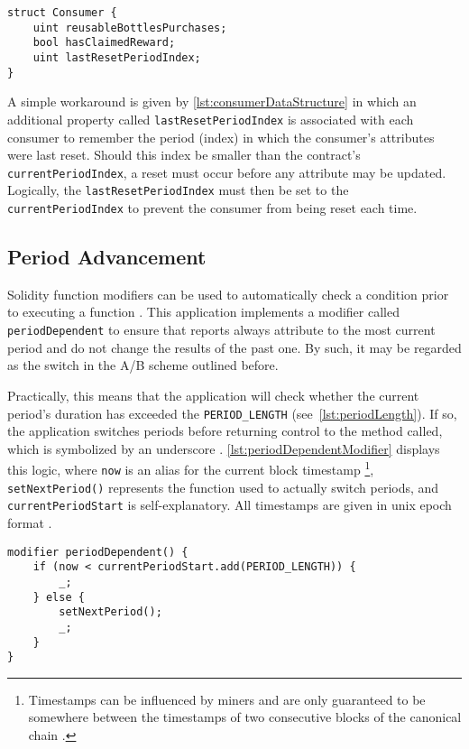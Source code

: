 \begin{lstlisting}[language=Solidity, caption=Consumer data structure, label=lst:consumerDataStructure]
struct Consumer {
	uint reusableBottlesPurchases;
	bool hasClaimedReward;
	uint lastResetPeriodIndex;
}
\end{lstlisting}

A simple workaround is given by \autoref{lst:consumerDataStructure} in which an additional property called \texttt{lastResetPeriodIndex} is associated with each consumer to remember the period (index) in which the consumer's attributes were last reset. Should this index be smaller than the contract's \texttt{currentPeriodIndex}, a reset must occur before any attribute may be updated. Logically, the \texttt{lastResetPeriodIndex} must then be set to the \texttt{currentPeriodIndex} to prevent the consumer from being reset each time.

\subsection{Period Advancement}
Solidity function modifiers can be used to automatically check a condition prior to executing a function \cite[p.~79]{solidityDocs}. This application implements a modifier called \texttt{periodDependent} to ensure that reports always attribute to the most current period and do not change the results of the past one. By such, it may be regarded as the switch in the A/B scheme outlined before.

Practically, this means that the application will check whether the current period's duration has exceeded the \texttt{PERIOD\_LENGTH} (see~\autoref{lst:periodLength}). If so, the application switches periods before returning control to the method called, which is symbolized by an underscore \cite[p.~81]{solidityDocs}. \autoref{lst:periodDependentModifier} displays this logic, where \texttt{now} is an alias for the current block timestamp \footnote{Timestamps can be influenced by miners and are only guaranteed to be somewhere between the timestamps of two consecutive blocks of the canonical chain \cite[p.~65]{solidityDocs}.}, \texttt{setNextPeriod()} represents the function used to actually switch periods, and \texttt{currentPeriodStart} is self-explanatory. All timestamps are given in unix epoch format \cite[p.~29]{solidityDocs}. 

\begin{lstlisting}[language=Solidity, caption=Function modifier to advance period, label=lst:periodDependentModifier]
modifier periodDependent() {	
	if (now < currentPeriodStart.add(PERIOD_LENGTH)) {
		_;
	} else {
		setNextPeriod();
		_;
	}
}
\end{lstlisting}

